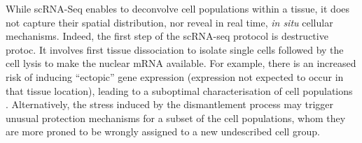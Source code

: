 While scRNA-Seq enables to deconvolve cell populations within a tissue, it does not capture their spatial distribution, nor reveal in real time, \textit{in situ} cellular mechanisms. Indeed, the first step of the scRNA-seq protocol is destructive protoc. It involves first tissue dissociation to isolate single cells followed by the cell lysis to make the nuclear mRNA available. For example, there is an increased risk of inducing \enquote{ectopic} gene expression (expression not expected to occur in that tissue location), leading to a suboptimal characterisation of cell populations \autocite{vandenbrink_etal17}. Alternatively, the stress induced by the dismantlement process may trigger unusual protection mechanisms for a subset of the cell populations, whom they are more proned to be wrongly assigned to a new undescribed cell group. 


